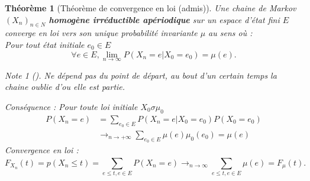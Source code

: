 \documentclass{article}
\theoremstyle{plain}%
\newtheorem{thm}{Théorème}[section]
\theoremstyle{definition}
\theoremstyle{remark}
\newtheorem*{note}{Note}
\begin{document}
\begin{thm}[Théorème de convergence en loi (admis)]
	Une chaine de Markov $ (X_n)_{n \in N} $ \textbf{homogène irréductible apériodique} sur un espace d'état fini $ E $ converge en loi vers son unique probabilité invariante $ \mu  $ au sens où  : \\
	Pour tout état initiale $ e_0 \in E $ 
	\[
		\forall e \in E , \lim_{n \to \infty} P(X_n = e | X_0=e_0) = \mu (e)
	.\]
	\begin{note}[]
		Ne dépend pas du point de départ, au bout d'un certain temps la chaine oublie d'ou elle est partie.
	\end{note}
	Conséquence : Pour toute loi initiale $ X_0 \sigma \mu _0 $ 
	\begin{align*}
		P(X_n = e) &= \sum_{e_0 \in E}^{} P(X_n = e | X_0 = e_0) P(X_0 = e_0) \\
					& \longrightarrow _{n \to + \infty } \sum_{e_0 \in E}^{}\mu (e) \mu_0(e_0) = \mu (e)
	\end{align*}
	Convergence en loi : 
	\[
		F_{X_n}(t) = p(X_n \leq t) = \sum_{e \leq t ,e \in E}^{}P(X_n = e) \longrightarrow _{n \to  \infty } \sum_{e \leq t, e \in E}^{}\mu (e) = F_\mu (t)
	.\]
\end{thm}
\end{document}
